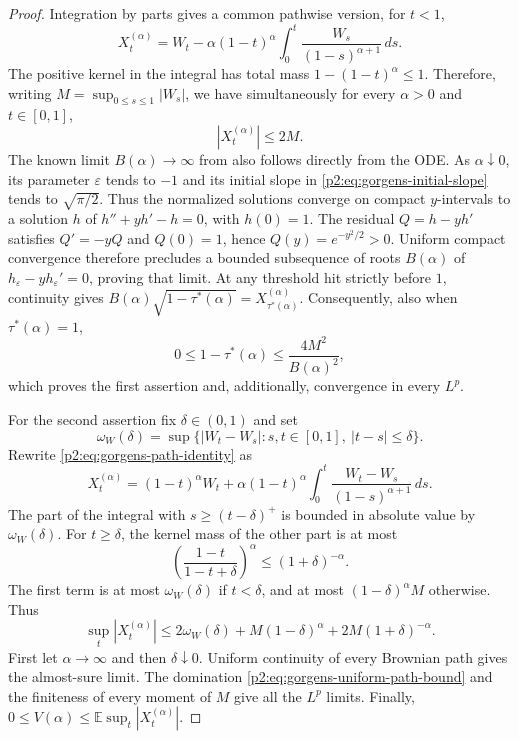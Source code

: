 \documentclass[11pt,a4paper]{article}
\theoremstyle{definition}
\theoremstyle{remark}
\numberwithin{equation}{section}
\begin{document}
\begin{proof}
Integration by parts gives a common pathwise version, for $t<1$,
\begin{equation}\label{p2:eq:gorgens-path-identity}
 X_t^{(\alpha)}
   =W_t-\alpha(1-t)^\alpha\int_0^t
                 \frac{W_s}{(1-s)^{\alpha+1}}\,ds.
\end{equation}
The positive kernel in the integral has total mass
$1-(1-t)^\alpha\leq1$. Therefore, writing
$M=\sup_{0\leq s\leq1}|W_s|$, we have simultaneously for every
$\alpha>0$ and $t\in[0,1]$,
\begin{equation}\label{p2:eq:gorgens-uniform-path-bound}
 |X_t^{(\alpha)}|\leq2M.
\end{equation}
The known limit $B(\alpha)\to\infty$ from
\cite[Theorem~2(i)]{p2:Gorgens2014} also follows directly from the ODE.
As $\alpha\downarrow0$, its parameter $\varepsilon$ tends to $-1$
and its initial slope in \eqref{p2:eq:gorgens-initial-slope} tends to
$\sqrt{\pi/2}$. Thus the normalized solutions converge on compact
$y$-intervals to a solution $h$ of $h''+yh'-h=0$, with $h(0)=1$.
The residual $Q=h-yh'$ satisfies $Q'=-yQ$ and $Q(0)=1$, hence
$Q(y)=e^{-y^2/2}>0$. Uniform compact convergence therefore precludes
a bounded subsequence of roots $B(\alpha)$ of
$h_\varepsilon-yh_\varepsilon'=0$, proving that limit.
At any threshold hit strictly before $1$,
continuity gives
$B(\alpha)\sqrt{1-\tau^*(\alpha)}=X_{\tau^*(\alpha)}^{(\alpha)}$.
Consequently, also when $\tau^*(\alpha)=1$,
\[
 0\leq1-\tau^*(\alpha)\leq\frac{4M^2}{B(\alpha)^2},
\]
which proves the first assertion and, additionally, convergence in
every $L^p$.

For the second assertion fix $\delta\in(0,1)$ and set
\[
 \omega_W(\delta)=\sup\{|W_t-W_s|:s,t\in[0,1],\ |t-s|\leq\delta\}.
\]
Rewrite \eqref{p2:eq:gorgens-path-identity} as
\[
 X_t^{(\alpha)}=(1-t)^\alpha W_t+
 \alpha(1-t)^\alpha\int_0^t
             \frac{W_t-W_s}{(1-s)^{\alpha+1}}\,ds.
\]
The part of the integral with $s\geq(t-\delta)^+$ is bounded in
absolute value by $\omega_W(\delta)$. For $t\geq\delta$, the kernel
mass of the other part is at most
\[
 \left(\frac{1-t}{1-t+\delta}\right)^\alpha
 \leq(1+\delta)^{-\alpha}.
\]
The first term is at most $\omega_W(\delta)$ if $t<\delta$, and
at most $(1-\delta)^\alpha M$ otherwise. Thus
\[
 \sup_t|X_t^{(\alpha)}|
 \leq2\omega_W(\delta)
        +M(1-\delta)^\alpha+2M(1+\delta)^{-\alpha}.
\]
First let $\alpha\to\infty$ and then $\delta\downarrow0$.
Uniform continuity of every Brownian path gives the almost-sure
limit. The domination \eqref{p2:eq:gorgens-uniform-path-bound} and the
finiteness of every moment of $M$ give all the $L^p$ limits. Finally,
$0\leq V(\alpha)\leq\mathbb E\sup_t|X_t^{(\alpha)}|$.
\end{proof}
\end{document}
